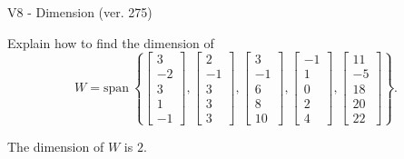 \begin{exercise}
  \begin{exerciseTitle}V8 - Dimension (ver. 275)\end{exerciseTitle}
  \begin{exerciseStatement}
    Explain how to find the dimension of 
\[W=\mathrm{span}\ \left\{\left[\begin{array}{r}
3 \\
-2 \\
3 \\
1 \\
-1
\end{array}\right] , \left[\begin{array}{r}
2 \\
-1 \\
3 \\
3 \\
3
\end{array}\right] , \left[\begin{array}{r}
3 \\
-1 \\
6 \\
8 \\
10
\end{array}\right] , \left[\begin{array}{r}
-1 \\
1 \\
0 \\
2 \\
4
\end{array}\right] , \left[\begin{array}{r}
11 \\
-5 \\
18 \\
20 \\
22
\end{array}\right]\right\}.\]



  \end{exerciseStatement}
  \begin{exerciseAnswer}
   The dimension of \(W\) is  \(2\).
  


  \end{exerciseAnswer}
\end{exercise}